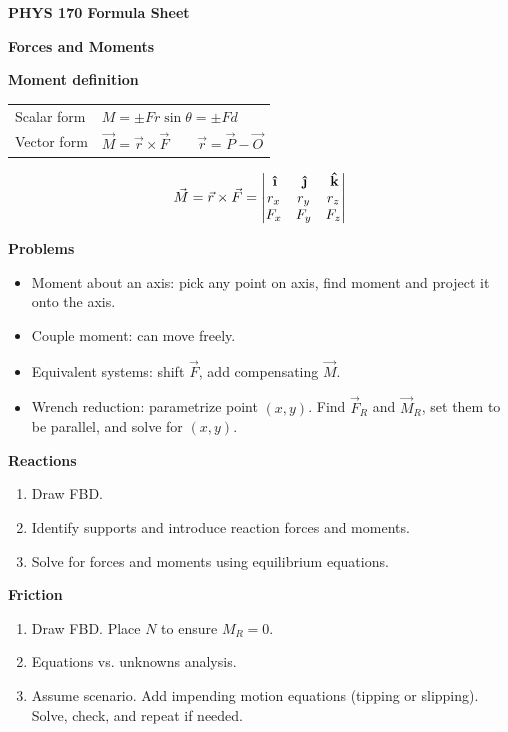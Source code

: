 \documentclass[10pt]{article}
\newcommand{\ihat}{{\,\bm{\hat{\textnormal{\bfseries\i}}}}}
\newcommand{\jhat}{{\,\bm{\hat{\textnormal{\bfseries\j}}}}}
\newcommand{\khat}{{\,\bm{\hat{\textnormal{\bfseries k}}}}}
\newcommand\sectionheading[1]{\begin{center}\large{\textbf{#1}}\end{center}\normalsize}
\newcommand\heading[1]{\medskip\textbf{#1}\medskip}
\begin{document}
\begin{center}
    \huge{\textbf{PHYS 170 Formula Sheet}}
\end{center}

\begin{multicols*}{3}
    
\sectionheading{Forces and Moments}

\heading{Moment definition}

\begin{tabular}{@{}ll}
    Scalar form & $M=\pm Fr\sin\theta=\pm Fd$ \\
    Vector form & $\vec{M}=\vec{r}\times\vec{F} \qquad \vec{r}=\vec{P}-\vec{O}$
\end{tabular}

\[\vec M=\vec r\times\vec F=\begin{vmatrix}
    \ihat & \jhat & \khat \\
    r_x & r_y & r_z \\
    F_x & F_y & F_z
\end{vmatrix}\]

\heading{Problems}
\begin{itemize}[itemsep=0pt,topsep=0pt]
    \item Moment about an axis: pick any point on axis, find moment and project it onto the axis.
    \item Couple moment: can move freely.
    \item Equivalent systems: shift $\vec F$, add compensating $\vec M$.
    \item Wrench reduction: parametrize point $(x,y)$. Find $\vec{F}_R$ and $\vec{M}_{R}$, set them to be parallel, and solve for $(x,y)$.
\end{itemize}

\sectionheading{Reactions}

\begin{enumerate}[itemsep=0pt,topsep=0pt]
    \item Draw FBD.
    \item Identify supports and introduce reaction forces and moments.
    \item Solve for forces and moments using equilibrium equations.
\end{enumerate}

\sectionheading{Friction}

\begin{enumerate}[itemsep=0pt,topsep=0pt]
    \item Draw FBD. Place $N$ to ensure $M_R=0$.
    \item Equations vs. unknowns analysis.
    \item Assume scenario. Add impending motion equations (tipping or slipping). Solve, check, and repeat if needed.
\end{enumerate}


\end{multicols*}
\end{document}
